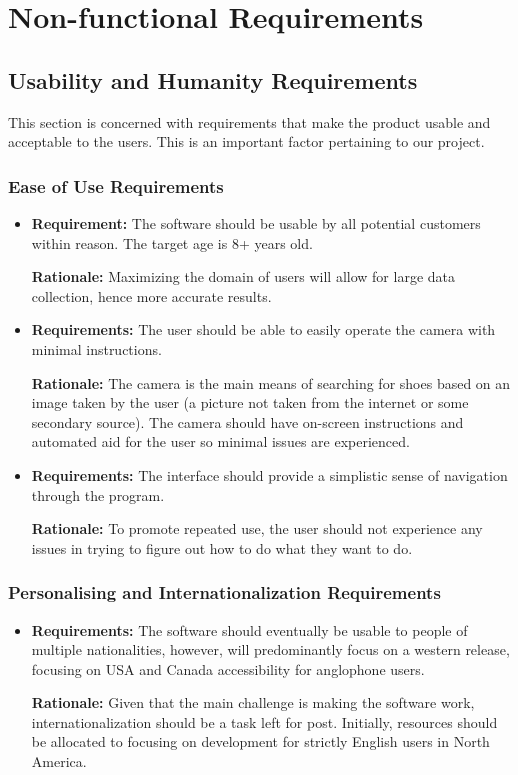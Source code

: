 \documentclass[12pt, titlepage]{article}
\begin{document}
\section{Non-functional Requirements}

\subsection{Usability and Humanity Requirements}
This section is concerned with requirements that make the product usable and acceptable to the users. This is an important factor pertaining to our project.

\subsubsection{Ease of Use Requirements}
\begin{itemize}{}
    \item \textbf{Requirement:} The software should be usable by all potential customers within reason. The target age is 8+ years old.
    
    \textbf{Rationale:} Maximizing the domain of users will allow for large data collection, hence more accurate results.
    
    \item \textbf{Requirements:} The user should be able to easily operate the camera with minimal instructions.
    
    \textbf{Rationale:} The camera is the main means of searching for shoes based on an image taken by the user (a picture not taken from the internet or some secondary source). The camera should have on-screen instructions and automated aid for the user so minimal issues are experienced.
    
    \item \textbf{Requirements:} The interface should provide a simplistic sense of navigation through the program.
    
    \textbf{Rationale:} To promote repeated use, the user should not experience any issues in trying to figure out how to do what they want to do.
\end{itemize}

\subsubsection{Personalising and Internationalization Requirements}
\begin{itemize}
    \item\textbf{Requirements:} The software should eventually be usable to people of multiple nationalities, however, will predominantly focus on a western release, focusing on USA and Canada accessibility for anglophone users.
    
    \textbf{Rationale:} Given that the main challenge is making the software work, internationalization should be a task left for post. Initially, resources should be allocated to focusing on development for strictly English users in North America.
\end{itemize}
\end{document}
